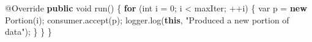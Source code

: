 \documentclass[11pt]{article}
\newenvironment{Shaded}{}{}
\newcommand{\KeywordTok}[1]{\textcolor[rgb]{0.00,0.44,0.13}{\textbf{{#1}}}}
\newcommand{\DataTypeTok}[1]{\textcolor[rgb]{0.56,0.13,0.00}{{#1}}}
\newcommand{\DecValTok}[1]{\textcolor[rgb]{0.25,0.63,0.44}{{#1}}}
\newcommand{\StringTok}[1]{\textcolor[rgb]{0.25,0.44,0.63}{{#1}}}
\newcommand{\FunctionTok}[1]{\textcolor[rgb]{0.02,0.16,0.49}{{#1}}}
\newcommand{\NormalTok}[1]{{#1}}
\newcommand{\ControlFlowTok}[1]{\textcolor[rgb]{0.00,0.44,0.13}{\textbf{{#1}}}}
\newcommand{\OperatorTok}[1]{\textcolor[rgb]{0.40,0.40,0.40}{{#1}}}
\newcommand{\AttributeTok}[1]{\textcolor[rgb]{0.49,0.56,0.16}{{#1}}}
\begin{document}
\begin{Shaded}
\begin{Highlighting}[]
    \AttributeTok{@Override}
    \KeywordTok{public} \DataTypeTok{void} \FunctionTok{run}\OperatorTok{()} \OperatorTok{\{}
        \ControlFlowTok{for} \OperatorTok{(}\DataTypeTok{int}\NormalTok{ i }\OperatorTok{=} \DecValTok{0}\OperatorTok{;}\NormalTok{ i }\OperatorTok{\textless{}}\NormalTok{ maxIter}\OperatorTok{;} \OperatorTok{++}\NormalTok{i}\OperatorTok{)} \OperatorTok{\{}
            \DataTypeTok{var}\NormalTok{ p }\OperatorTok{=} \KeywordTok{new} \FunctionTok{Portion}\OperatorTok{(}\NormalTok{i}\OperatorTok{);}
\NormalTok{            consumer}\OperatorTok{.}\FunctionTok{accept}\OperatorTok{(}\NormalTok{p}\OperatorTok{);}
\NormalTok{            logger}\OperatorTok{.}\FunctionTok{log}\OperatorTok{(}\KeywordTok{this}\OperatorTok{,} \StringTok{"Produced a new portion of data"}\OperatorTok{);}
        \OperatorTok{\}}
    \OperatorTok{\}}
\OperatorTok{\}}
\end{Highlighting}
\end{Shaded}
\end{document}

